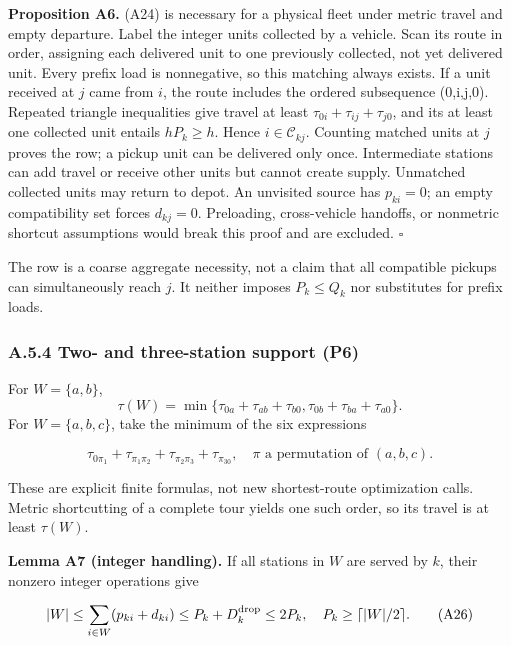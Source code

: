\documentclass[
  american,
  11pt,
]{article}
\begin{document}

\textbf{Proposition A6.} (A24) is necessary for a physical fleet under
metric travel and empty departure. Label the integer units collected by
a vehicle. Scan its route in order, assigning each delivered unit to one
previously collected, not yet delivered unit. Every prefix load is
nonnegative, so this matching always exists. If a unit received at \(j\)
came from \(i\), the route includes the ordered subsequence (0,i,j,0).
Repeated triangle inequalities give travel at least
\(\tau_{0i}+\tau_{ij}+\tau_{j0}\), and its at least one collected unit
entails \(hP_k\ge h\). Hence \(i\in\mathcal C_{kj}\). Counting matched
units at \(j\) proves the row; a pickup unit can be delivered only once.
Intermediate stations can add travel or receive other units but cannot
create supply. Unmatched collected units may return to depot. An
unvisited source has \(p_{ki}=0\); an empty compatibility set forces
\(d_{kj}=0\). Preloading, cross-vehicle handoffs, or nonmetric shortcut
assumptions would break this proof and are excluded. \(\square\)

The row is a coarse aggregate necessity, not a claim that all compatible
pickups can simultaneously reach \(j\). It neither imposes
\(P_k\le Q_k\) nor substitutes for prefix loads.

\subsubsection{A.5.4 Two- and three-station support
(P6)}\label{a.5.4-two--and-three-station-support-p6}

For \(W=\{a,b\}\), \[
\tau(W)=\min\{\tau_{0a}+\tau_{ab}+\tau_{b0},\tau_{0b}+\tau_{ba}+\tau_{a0}\}.
\] For \(W=\{a,b,c\}\), take the minimum of the six expressions

\[
\tau_{0\pi_1}+\tau_{\pi_1\pi_2}+\tau_{\pi_2\pi_3}+\tau_{\pi_30},\quad \pi\text{ a permutation of }(a,b,c).
\tag{A25}
\]

These are explicit finite formulas, not new shortest-route optimization
calls. Metric shortcutting of a complete tour yields one such order, so
its travel is at least \(\tau(W)\).


\textbf{Lemma A7 (integer handling).} If all stations in \(W\) are
served by \(k\), their nonzero integer operations give

\[
|W|\le\sum_{i\in W}(p_{ki}+d_{ki})\le P_k+D_k^{\rm drop}\le2P_k,
\quad P_k\ge\lceil |W|/2\rceil.
\tag{A26}
\]
\end{document}
